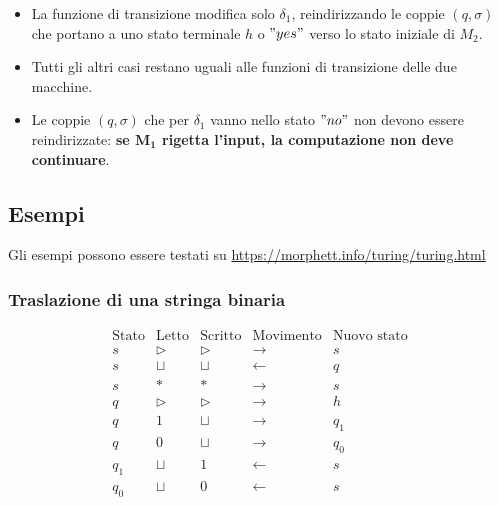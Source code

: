 \begin{itemize}
	\item La funzione di transizione modifica solo $\delta_1$, reindirizzando le coppie $(q, \sigma)$ che portano a uno stato terminale $h$ o $"yes"$ verso lo stato iniziale di $M_2$. 
	\item Tutti gli altri casi restano uguali alle funzioni di transizione delle due macchine.
	\item Le coppie $(q, \sigma)$ che per $\delta_1$ vanno nello stato $"no"$ non devono essere reindirizzate: \textbf{se $\mathbf{M_1}$ rigetta l'input, la computazione non deve continuare}.
\end{itemize}

\subsection{Esempi}
Gli esempi possono essere testati su \url{https://morphett.info/turing/turing.html}

\subsubsection{Traslazione di una stringa binaria}
\label{example:shift}
\[
\begin{array}{c|c|c|c|c}
\text{Stato} & \text{Letto} & \text{Scritto} & \text{Movimento} & \text{Nuovo stato} \\ \hline
s   & \triangleright & \triangleright & \rightarrow & s \\
s   & \sqcup         & \sqcup         & \leftarrow  & q \\
s   & *              & *              & \rightarrow & s \\
q   & \triangleright & \triangleright & \rightarrow & h \\
q   & 1              & \sqcup         & \rightarrow & q_1 \\
q   & 0              & \sqcup         & \rightarrow & q_0 \\
q_1 & \sqcup         & 1              & \leftarrow  & s \\
q_0 & \sqcup         & 0              & \leftarrow  & s
\end{array}
\]
